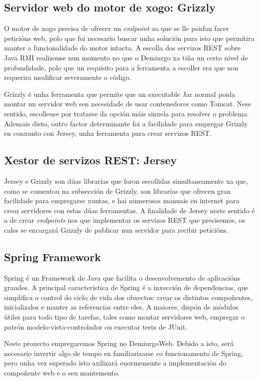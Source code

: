 \subsection{Servidor web do motor de xogo: Grizzly}
O motor de xogo precisa de ofrecer un \textit{endpoint} ao que se lle poidan
facer peticións web, polo que foi necesario buscar unha solución para isto que
permitira manter a funcionalidade do motor intacta. A escolla dos servizos REST
sobre Java RMI realizouse nun momento no que o Demiurgo xa tiña un certo nivel
de profundidade, polo que un requisito para a ferramenta a escoller era que non
requerira modificar severamente o código.
\par
Grizzly é unha ferramenta que permite que un executable Jar normal poida montar
un servidor web sen necesidade de usar contenedores como Tomcat. Nese sentido,
escolleuse por tratarse da opción máis sinxela para resolver o problema. Ademais
disto, outro factor determinante foi a facilidade para empregar Grizzly en
conxunto con Jersey, unha ferramenta para crear servizos REST.

\subsection{Xestor de servizos REST: Jersey}
Jersey e Grizzly son dúas librarías que foron escollidas simultaneamente xa que,
como se comentou na subsección de Grizzly, son librarías que ofrecen gran
facilidade para empregarse xuntas, e hai numerosos manuais en internet para
crear servidores con estas dúas ferramentas. A finalidade de Jersey neste
sentido é a de crear \textit{endpoints} nos que implementar os servizos REST que
precisemos, os cales se encargará Grizzly de publicar nun servidor para recibir
peticións.

\subsection{Spring Framework}
Spring\cite{spring} é un Framework de Java que facilita o desenvolvemento de aplicacións
grandes. A principal característica de Spring é a inxección de dependencias, que
simplifica o control do ciclo de vida dos obxectos: crear os distintos
compoñentes, inicializalos e manter as referencias entre eles. A maiores, dispón
de módulos útiles para todo tipo de tarefas, tales como montar servidores web,
empregar o patrón modelo-vista-controlador ou executar tests de JUnit.
\par
Neste proxecto empregaremos Spring no DemiurgoWeb. Debido a isto, será necesario
invertir algo de tempo en familiarizarse co funcionamento de Spring, pero unha
vez superado isto axilizará enormemente a implementación do compoñente web e o
seu mantemento.

